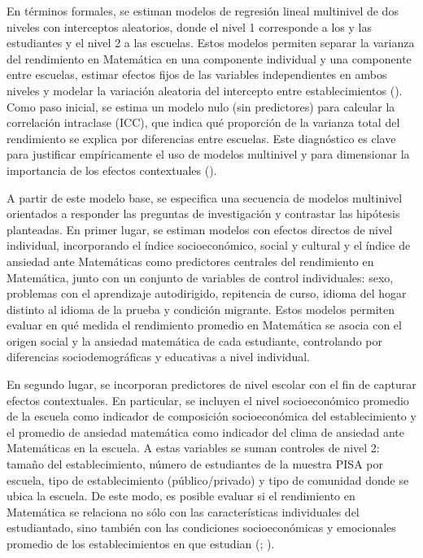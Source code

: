 \documentclass[
  spanish,
  a4paper,
  oneside]{scrbook}
\begin{document}
En términos formales, se estiman modelos de regresión lineal multinivel
de dos niveles con interceptos aleatorios, donde el nivel 1 corresponde
a los y las estudiantes y el nivel 2 a las escuelas. Estos modelos
permiten separar la varianza del rendimiento en Matemática en una
componente individual y una componente entre escuelas, estimar efectos
fijos de las variables independientes en ambos niveles y modelar la
variación aleatoria del intercepto entre establecimientos
(). Como paso inicial, se
estima un modelo nulo (sin predictores) para calcular la correlación
intraclase (ICC), que indica qué proporción de la varianza total del
rendimiento se explica por diferencias entre escuelas. Este diagnóstico
es clave para justificar empíricamente el uso de modelos multinivel y
para dimensionar la importancia de los efectos contextuales
().

A partir de este modelo base, se especifica una secuencia de modelos
multinivel orientados a responder las preguntas de investigación y
contrastar las hipótesis planteadas. En primer lugar, se estiman modelos
con efectos directos de nivel individual, incorporando el índice
socioeconómico, social y cultural y el índice de ansiedad ante
Matemáticas como predictores centrales del rendimiento en Matemática,
junto con un conjunto de variables de control individuales: sexo,
problemas con el aprendizaje autodirigido, repitencia de curso, idioma
del hogar distinto al idioma de la prueba y condición migrante. Estos
modelos permiten evaluar en qué medida el rendimiento promedio en
Matemática se asocia con el origen social y la ansiedad matemática de
cada estudiante, controlando por diferencias sociodemográficas y
educativas a nivel individual.

En segundo lugar, se incorporan predictores de nivel escolar con el fin
de capturar efectos contextuales. En particular, se incluyen el nivel
socioeconómico promedio de la escuela como indicador de composición
socioeconómica del establecimiento y el promedio de ansiedad matemática
como indicador del clima de ansiedad ante Matemáticas en la escuela. A
estas variables se suman controles de nivel 2: tamaño del
establecimiento, número de estudiantes de la muestra PISA por escuela,
tipo de establecimiento (público/privado) y tipo de comunidad donde se
ubica la escuela. De este modo, es posible evaluar si el rendimiento en
Matemática se relaciona no sólo con las características individuales del
estudiantado, sino también con las condiciones socioeconómicas y
emocionales promedio de los establecimientos en que estudian
(;
).
\end{document}
